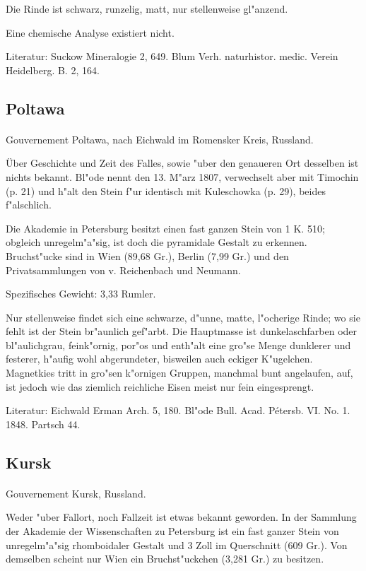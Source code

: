 \documentclass[a4paper, 11pt, oneside]{article}
\begin{document}
Die Rinde ist schwarz, runzelig, matt, nur stellenweise gl"anzend.

Eine chemische Analyse existiert nicht.

\footnotesize
Literatur: Suckow Mineralogie 2, 649. Blum Verh. naturhistor. medic. Verein Heidelberg. B. 2, 164.

\subsection{Poltawa}
\normalsize
\paragraph{}
Gouvernement Poltawa, nach Eichwald im Romensker Kreis, Russland.

Über Geschichte und Zeit des Falles, sowie "uber den genaueren Ort desselben ist nichts bekannt. Bl"ode nennt den 13. M"arz 1807, verwechselt aber mit Timochin (p. 21) und h"alt den Stein f"ur identisch mit Kuleschowka (p. 29), beides f"alschlich.

Die Akademie in Petersburg besitzt einen fast ganzen Stein von 1 K. 510; obgleich unregelm"a"sig, ist doch die pyramidale Gestalt zu erkennen. Bruchst"ucke sind in Wien (89,68 Gr.), Berlin (7,99 Gr.) und den Privatsammlungen von v. Reichenbach und Neumann.

Spezifisches Gewicht: 3,33 Rumler.

Nur stellenweise findet sich eine schwarze, d"unne, matte, l"ocherige Rinde; wo sie fehlt ist der Stein br"aunlich gef"arbt. Die Hauptmasse ist dunkelaschfarben oder bl"aulichgrau, feink"ornig, por"os und enth"alt eine gro"se Menge dunklerer und festerer, h"aufig wohl abgerundeter, bisweilen auch eckiger K"ugelchen. Magnetkies tritt in gro"sen k"ornigen Gruppen, manchmal bunt angelaufen, auf, ist jedoch wie das ziemlich reichliche Eisen meist nur fein eingesprengt.

\footnotesize
Literatur: Eichwald Erman Arch. 5, 180. Bl"ode Bull. Acad. Pétersb. VI. No. 1. 1848. Partsch 44.

\subsection{Kursk}
\normalsize
\paragraph{}
Gouvernement Kursk, Russland.

Weder "uber Fallort, noch Fallzeit ist etwas bekannt geworden. In der Sammlung der Akademie der Wissenschaften zu Petersburg ist ein fast ganzer Stein von unregelm"a"sig rhomboidaler Gestalt und 3 Zoll im Querschnitt (609 Gr.). Von demselben scheint nur Wien ein Bruchst"uckchen (3,281 Gr.) zu besitzen.
\end{document}
